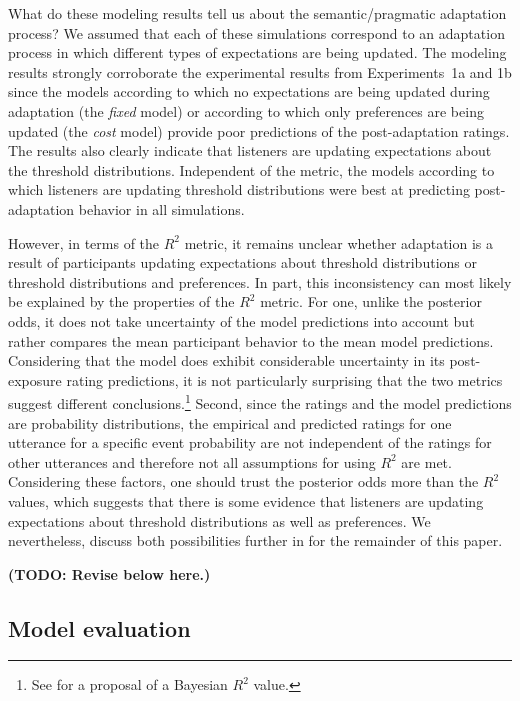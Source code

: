 \documentclass[lucida,biblatex]{sp} %
\newcommand{\todo}[1]{}
\renewcommand{\todo}[1]{{\bf \color{red} (TODO: {#1})}}
\begin{document}
What do these modeling results tell us about the semantic/pragmatic adaptation process? 
We assumed that each of these simulations
correspond to an adaptation process in which different types of expectations are being updated.
The modeling results strongly corroborate the experimental results from Experiments~1a and 1b since
the models according to which no expectations are being updated during adaptation (the \textit{fixed} model) 
or according to which only preferences are being updated (the \textit{cost} model) provide poor predictions of the post-adaptation
ratings. The results also clearly indicate that listeners are updating expectations about the threshold distributions. Independent of
the metric, the models according to which listeners are updating threshold distributions were best at predicting post-adaptation
behavior in all simulations. 

However, in terms of the $R^2$ metric, it remains unclear whether adaptation is a result of 
participants updating expectations about threshold distributions or threshold distributions and preferences. 
In part, this inconsistency can most likely be explained by the properties of the $R^2$ metric. For one, unlike the posterior odds, 
it does not take uncertainty of the model predictions into account but rather compares the mean participant behavior to the mean 
model predictions. Considering that the model does exhibit considerable uncertainty in its post-exposure rating predictions, it is not
particularly surprising that the two metrics suggest different conclusions.\footnote{See \citep{Gelman2018} for a proposal of a Bayesian $R^2$ value.}
Second, since the ratings and the model predictions are probability distributions, 
the empirical and predicted ratings for one utterance for a specific event probability are not independent 
of the ratings for other utterances and therefore not all assumptions for using $R^2$ are met. Considering these
factors, one should trust the posterior odds more than the $R^2$ values, which suggests that there is some evidence that listeners 
are updating expectations about {threshold distributions} as well as {preferences}. We nevertheless, discuss both possibilities further in
for the remainder of this paper.

\todo{Revise below here.}



\subsection{Model evaluation}
\end{document}

